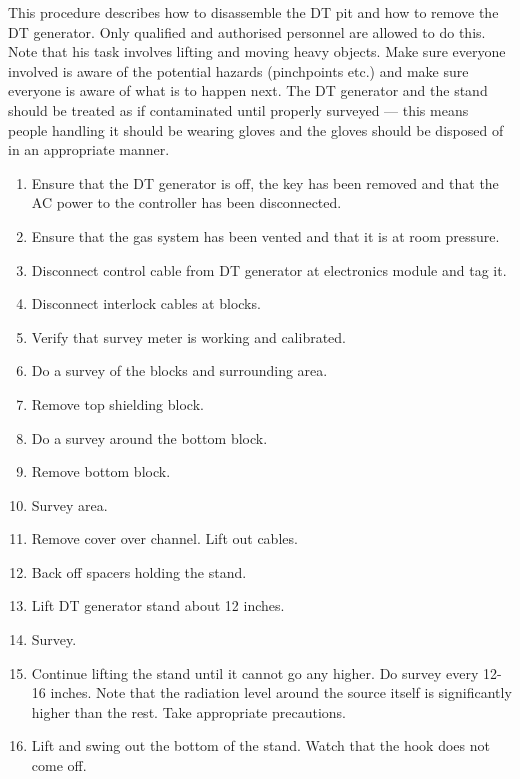 \documentclass[10pt]{article}
\begin{document}
This procedure describes how to disassemble the DT pit and how to remove the DT generator. Only qualified and authorised personnel are allowed to do this. Note that his task involves lifting and moving heavy objects. Make sure everyone involved is aware of the potential hazards (pinchpoints etc.) and make sure everyone is aware of what is to happen next. The DT generator and the stand should be treated as if contaminated until properly surveyed --- this means people handling it should be wearing gloves and the gloves should be disposed of in an appropriate manner. 
\begin{enumerate}
\item \CheckBox[name=dtpdp1]{} Ensure that the DT generator is off, the key has been removed and that the AC power to the controller has been disconnected.
\item \CheckBox[name=dtpdp2]{} Ensure that the gas system has been vented and that it is at room pressure.
\item \CheckBox[name=dtpdp3]{} Disconnect control cable from DT generator at electronics module and tag it.
\item \CheckBox[name=dtpdp4]{} Disconnect interlock cables at blocks.
\item \CheckBox[name=dtpdp5]{} Verify that survey meter is working and calibrated.
\item \CheckBox[name=dtpdp6]{} Do a survey of the blocks and surrounding area.
\item \CheckBox[name=dtpdp7]{} Remove top shielding block.
\item \CheckBox[name=dtpdp8]{} Do a survey around the bottom block.
\item \CheckBox[name=dtpdp9]{} Remove bottom block.
\item \CheckBox[name=dtpdp10]{} Survey area.
\item \CheckBox[name=dtpdp11]{} Remove cover over channel. Lift out cables.
\item \CheckBox[name=dtpdp12]{} Back off spacers holding the stand.
\item \CheckBox[name=dtpdp13]{} Lift DT generator stand about 12 inches.
\item \CheckBox[name=dtpdp14]{} Survey.
\item \CheckBox[name=dtpdp15]{} Continue lifting the stand until it cannot go any higher. Do survey every 12-16 inches. Note that the radiation level around the source itself is significantly higher than the rest. Take appropriate precautions.
\item \CheckBox[name=dtpdp16]{} Lift and swing out the bottom of the stand. Watch that the hook does not come off. 

\end{enumerate}
\end{document}
